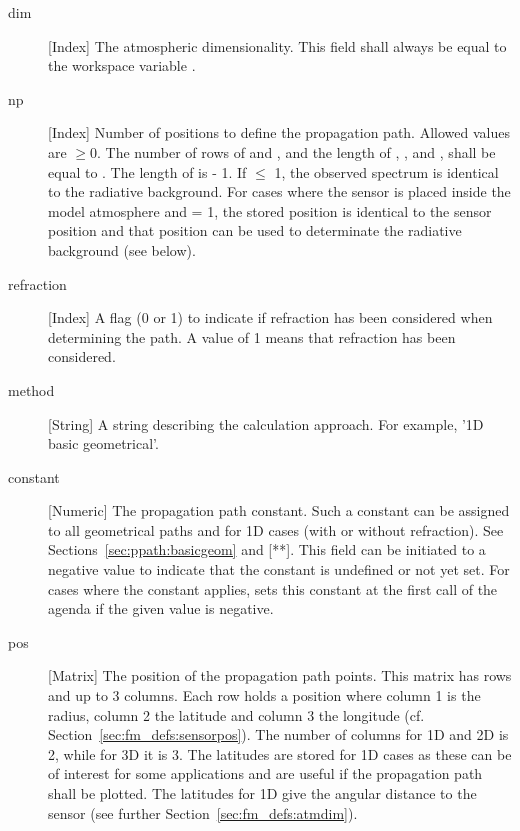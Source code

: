 \begin{description}

  \item[dim] [Index] The atmospheric dimensionality. This field shall always 
     be equal to the workspace variable .
     
   \item[np] [Index] Number of positions to define the propagation
     path. Allowed values are $\geq 0$. The number of rows of
      and , and the length of
     , ,  and
     , shall be equal to . The length
     of  is  - 1. If 
     $\leq$ 1, the observed spectrum is identical to the radiative
     background. For cases where the sensor is placed inside the model
     atmosphere and  = 1, the stored position is
     identical to the sensor position and that position can be used to
     determinate the radiative background (see below).

   \item[refraction] [Index] A flag (0 or 1) to indicate if refraction
     has been considered when determining the path. A value of 1 means
     that refraction has been considered.

   \item[method] [String] A string describing the calculation approach.
     For example, '1D basic geometrical'.
     
   \item[constant] [Numeric] The propagation path constant. Such a
     constant can be assigned to all geometrical paths and for 1D
     cases (with or without refraction). See
     Sections~\ref{sec:ppath:basicgeom} and [**]. This field can be
     initiated to a negative value to indicate that the constant is
     undefined or not yet set. For cases where the constant applies,
      sets this constant at the first
     call of the agenda if the given value is negative.

   \item[pos] [Matrix] The position of the propagation path points.
     This matrix has  rows and up to 3 columns. Each row
     holds a position where column 1 is the radius, column 2 the
     latitude and column 3 the longitude (cf.
     Section~\ref{sec:fm_defs:sensorpos}). The number of columns for
     1D and 2D is 2, while for 3D it is 3. The latitudes are stored
     for 1D cases as these can be of interest for some applications
     and are useful if the propagation path shall be plotted. The
     latitudes for 1D give the angular distance to the sensor (see
     further Section~\ref{sec:fm_defs:atmdim}).
     

\end{description}
